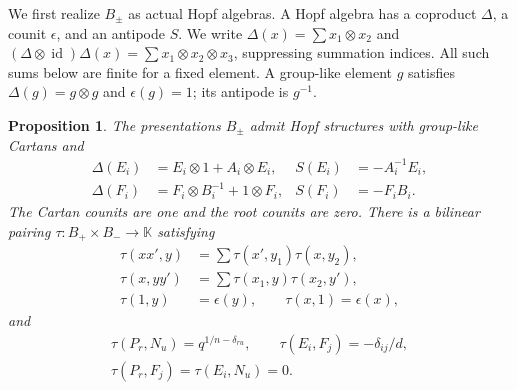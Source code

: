 \documentclass[11pt]{article}
\newtheorem{proposition}[theorem]{Proposition}
\theoremstyle{definition}
\theoremstyle{remark}
\newcommand{\kk}{\mathbb{K}}
\newcommand{\id}{\operatorname{id}}
\begin{document}
We first realize $B_\pm$ as actual Hopf algebras. A Hopf algebra has a coproduct $\Delta$, a counit $\epsilon$, and an antipode $S$. We write $\Delta(x)=\sum x_1\otimes x_2$ and $(\Delta\otimes\id)\Delta(x)=\sum x_1\otimes x_2\otimes x_3$, suppressing summation indices. All such sums below are finite for a fixed element. A group-like element $g$ satisfies $\Delta(g)=g\otimes g$ and $\epsilon(g)=1$; its antipode is $g^{-1}$.

\begin{proposition}\label{prop:pairing}
The presentations $B_\pm$ admit Hopf structures with group-like Cartans and
\begin{equation}\label{eq:hopf}
 \begin{aligned}
 \Delta(E_i)&=E_i\otimes1+A_i\otimes E_i,&S(E_i)&=-A_i^{-1}E_i,\\
 \Delta(F_i)&=F_i\otimes B_i^{-1}+1\otimes F_i,&S(F_i)&=-F_iB_i.
 \end{aligned}
\end{equation}
The Cartan counits are one and the root counits are zero. There is a bilinear pairing $\tau:B_+\times B_-\to\kk$ satisfying
\begin{equation}\label{eq:skew}
 \begin{aligned}
 \tau(xx',y)&=\sum\tau(x',y_1)\tau(x,y_2),\\
 \tau(x,yy')&=\sum\tau(x_1,y)\tau(x_2,y'),\\
 \tau(1,y)&=\epsilon(y),\qquad \tau(x,1)=\epsilon(x),
 \end{aligned}
\end{equation}
and
\begin{equation}\label{eq:table}
 \begin{gathered}
 \tau(P_r,N_u)=q^{1/n-\delta_{ru}},\qquad
 \tau(E_i,F_j)=-\delta_{ij}/d,\\
 \tau(P_r,F_j)=\tau(E_i,N_u)=0.
 \end{gathered}
\end{equation}
\end{proposition}
\end{document}
